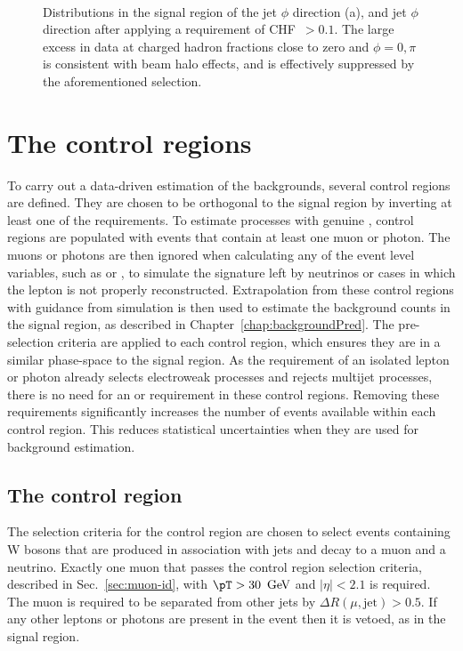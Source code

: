 \begin{figure}[!h]
{ } \\
  \caption{Distributions in the signal region of the jet $\phi$
  direction (a), and jet $\phi$ direction after applying a requirement
  of \ac{CHF}~$>0.1$. The large excess in data at charged hadron
  fractions close to zero and ${\phi = 0, \pi}$ is consistent with
  beam halo effects, and is effectively suppressed by the
  aforementioned selection.}
  \label{fig:leadJetCleaning}
\end{figure}

\section{The control regions}
\label{sec:controlregions}

To carry out a data-driven estimation of the \SM backgrounds, several
control regions are defined. They are chosen to be orthogonal to the
signal region by inverting at least one of the requirements. To estimate
processes with genuine \MET, control regions are populated with events
that contain at least one muon or photon. The muons or photons are then
ignored when calculating any of the event level variables, such as
\alphat or \bdphi, to simulate the signature left by neutrinos or
cases in which the lepton is not properly reconstructed. Extrapolation
from these control regions with guidance from simulation is then used
to estimate the background counts in the signal region, as described
in Chapter~\ref{chap:backgroundPred}. The pre-selection criteria
are applied to each control region, which ensures they are in a similar
phase-space to the signal region. As the requirement of an isolated
lepton or photon already selects electroweak processes and rejects
\QCD multijet processes, there is no need for an \alphat or \bdphi
requirement in these control regions. Removing these requirements
significantly increases the number of events available within each
control region. This reduces statistical uncertainties when they are
used for background estimation.

\subsection{The \mj control region}

The selection criteria for the \mj control region are chosen to select
events containing W bosons that are produced in association with
jets and decay to a muon and a neutrino. Exactly one muon that passes
the control region selection criteria, described in Sec.~\ref{sec:muon-id}, with
$\pT>30~\gev$ and $|\eta|<2.1$ is required. The muon is required to be
separated from other jets by $\Delta R(\mu,\mathrm{jet})>0.5$. If any
other leptons or photons are present in the event then it is vetoed, as
in the signal region.

